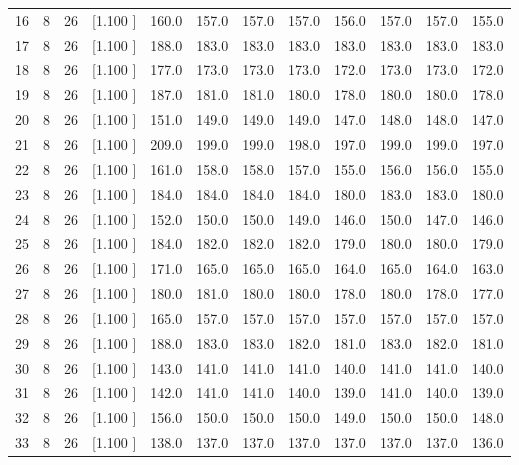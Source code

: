 \documentclass[12pt,a4paper]{article}
\begin{document}
\begin{center}
{\begin{tabular}{r r r r r r r r r r r r}
  16&  8& 26&[1.100     ]&   160.0&   157.0&   157.0&   157.0&   156.0&   157.0&   157.0&   155.0\\[-0.02in]
  17&  8& 26&[1.100     ]&   188.0&   183.0&   183.0&   183.0&   183.0&   183.0&   183.0&   183.0\\[-0.02in]
  18&  8& 26&[1.100     ]&   177.0&   173.0&   173.0&   173.0&   172.0&   173.0&   173.0&   172.0\\[-0.02in]
  19&  8& 26&[1.100     ]&   187.0&   181.0&   181.0&   180.0&   178.0&   180.0&   180.0&   178.0\\[-0.02in]
  20&  8& 26&[1.100     ]&   151.0&   149.0&   149.0&   149.0&   147.0&   148.0&   148.0&   147.0\\[-0.02in]
  21&  8& 26&[1.100     ]&   209.0&   199.0&   199.0&   198.0&   197.0&   199.0&   199.0&   197.0\\[-0.02in]
  22&  8& 26&[1.100     ]&   161.0&   158.0&   158.0&   157.0&   155.0&   156.0&   156.0&   155.0\\[-0.02in]
  23&  8& 26&[1.100     ]&   184.0&   184.0&   184.0&   184.0&   180.0&   183.0&   183.0&   180.0\\[-0.02in]
  24&  8& 26&[1.100     ]&   152.0&   150.0&   150.0&   149.0&   146.0&   150.0&   147.0&   146.0\\[-0.02in]
  25&  8& 26&[1.100     ]&   184.0&   182.0&   182.0&   182.0&   179.0&   180.0&   180.0&   179.0\\[-0.02in]
  26&  8& 26&[1.100     ]&   171.0&   165.0&   165.0&   165.0&   164.0&   165.0&   164.0&   163.0\\[-0.02in]
  27&  8& 26&[1.100     ]&   180.0&   181.0&   180.0&   180.0&   178.0&   180.0&   178.0&   177.0\\[-0.02in]
  28&  8& 26&[1.100     ]&   165.0&   157.0&   157.0&   157.0&   157.0&   157.0&   157.0&   157.0\\[-0.02in]
  29&  8& 26&[1.100     ]&   188.0&   183.0&   183.0&   182.0&   181.0&   183.0&   182.0&   181.0\\[-0.02in]
  30&  8& 26&[1.100     ]&   143.0&   141.0&   141.0&   141.0&   140.0&   141.0&   141.0&   140.0\\[-0.02in]
  31&  8& 26&[1.100     ]&   142.0&   141.0&   141.0&   140.0&   139.0&   141.0&   140.0&   139.0\\[-0.02in]
  32&  8& 26&[1.100     ]&   156.0&   150.0&   150.0&   150.0&   149.0&   150.0&   150.0&   148.0\\[-0.02in]
  33&  8& 26&[1.100     ]&   138.0&   137.0&   137.0&   137.0&   137.0&   137.0&   137.0&   136.0\\[-0.02in]

\end{tabular}}
\end{center}
\end{document}
